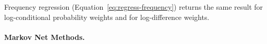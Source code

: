 \documentclass[twoside,leqno,twocolumn]{article}
\begin{document}
\begin{table}[t]
\caption{Regression models + Bayes net weight conversion methods; the frequency models are mathematically equivalent to each other and to random regression.}
\begin{center}
\end{center}
\label{table:methods}
\end{table}%


\begin{proposition}
Frequency regression (Equation~\ref{eq:regress-frequency}) returns the same result for log-conditional probability weights and for log-difference weights.
\end{proposition}






%

\paragraph{Markov Net Methods.}
\end{document}
